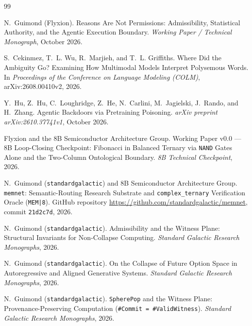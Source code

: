 \documentclass[10pt, twocolumn, a4paper]{article}
\begin{document}
\begin{thebibliography}{99}
\footnotesize
\setlength{\itemsep}{1pt}
\setlength{\parskip}{0pt}

N.~Guimond (Flyxion).
\newblock Reasons Are Not Permissions: Admissibility, Statistical Authority, and the Agentic Execution Boundary.
\newblock \emph{Working Paper / Technical Monograph}, October 2026.

S.~Cekinmez, T.~L. Wu, R.~Marjieh, and T.~L. Griffiths.
\newblock Where Did the Ambiguity Go? Examining How Multimodal Models Interpret Polysemous Words.
\newblock In \emph{Proceedings of the Conference on Language Modeling (COLM)}, arXiv:2608.00410v2, 2026.

Y.~Hu, Z.~Hu, C.~Loughridge, Z.~He, N.~Carlini, M.~Jagielski, J.~Rando, and H.~Zhang.
\newblock Agentic Backdoors via Pretraining Poisoning.
\newblock \emph{arXiv preprint arXiv:2610.37741v1}, October 2026.

Flyxion and the 8B Semiconductor Architecture Group.
\newblock Working Paper v0.0 --- 8B Loop-Closing Checkpoint: Fibonacci in Balanced Ternary via \texttt{NAND} Gates Alone and the Two-Column Ontological Boundary.
\newblock \emph{8B Technical Checkpoint}, 2026.

N.~Guimond (\texttt{standardgalactic}) and 8B Semiconductor Architecture Group.
\newblock \texttt{memnet}: Semantic-Routing Research Substrate and \texttt{complex\_ternary} Verification Oracle (\texttt{MEM|8}).
\newblock GitHub repository \url{https://github.com/standardgalactic/memnet}, commit \texttt{21d2c7d}, 2026.

N.~Guimond (\texttt{standardgalactic}).
\newblock Admissibility and the Witness Plane: Structural Invariants for Non-Collapse Computing.
\newblock \emph{Standard Galactic Research Monographs}, 2026.

N.~Guimond (\texttt{standardgalactic}).
\newblock On the Collapse of Future Option Space in Autoregressive and Aligned Generative Systems.
\newblock \emph{Standard Galactic Research Monographs}, 2026.

N.~Guimond (\texttt{standardgalactic}).
\newblock \texttt{SpherePop} and the Witness Plane: Provenance-Preserving Computation (\texttt{\#Commit = \#ValidWitness}).
\newblock \emph{Standard Galactic Research Monographs}, 2026.


\end{thebibliography}
\end{document}
